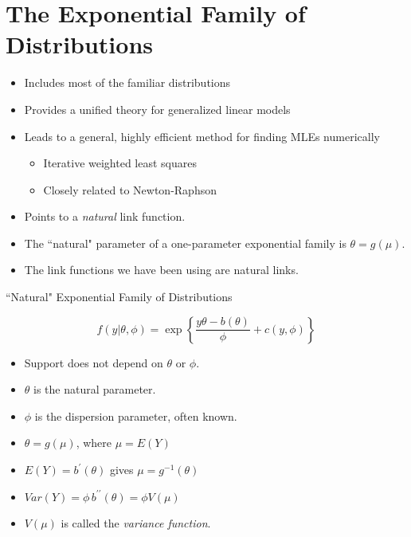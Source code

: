 \documentclass[twoside,a4paper,12pt]{article}
\begin{document}
\section{The Exponential Family of Distributions}



\begin{itemize}
\item Includes most of the familiar distributions
\item Provides a unified theory for generalized linear models
\item Leads to a general, highly efficient method for finding MLEs numerically
\begin{itemize}
	\item Iterative weighted least squares
	\item Closely related to Newton-Raphson
\end{itemize}
\item Points to a \emph{natural} link function.
\item The ``natural" parameter of a one-parameter exponential family is $\theta=g(\mu)$.
\item The link functions we have been using are natural links.
\end{itemize}
``Natural" Exponential Family of Distributions


{\LARGE
\begin{displaymath}
	f(y|\theta,\phi) = 
	\exp\left\{ \frac{y\theta-b(\theta)}{\phi} + c(y,\phi)\right\}
\end{displaymath} }
\begin{itemize}
\item Support does not depend on $\theta$ or $\phi$.
\item $\theta$ is the natural parameter.
\item $\phi$ is the dispersion parameter, often known.
\item $\theta=g(\mu)$, where $\mu=E(Y)$
\item $E(Y) = b^\prime(\theta)$ gives $\mu=g^{-1}(\theta)$
\item $Var(Y) =  \phi \, b^{\prime\prime}(\theta) = \phi V(\mu)$
\item $V(\mu)$ is called the \emph{variance function}.
\end{itemize}
\end{document}
